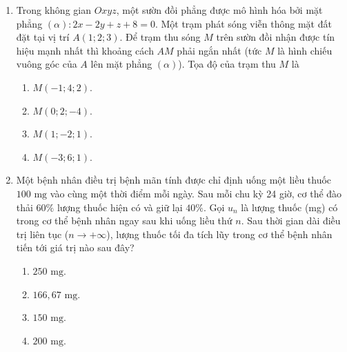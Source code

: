 \documentclass[12pt,a4paper]{article}
\begin{document}
\begin{enumerate}[label=\textbf{Câu \arabic*:}, leftmargin=*]
\item
\begin{minipage}[t]{\linewidth} 
Trong không gian $Oxyz$, một sườn đồi phẳng được mô hình hóa bởi mặt phẳng $(\alpha): 2x - 2y + z + 8 = 0$. Một trạm phát sóng viễn thông mặt đất đặt tại vị trí $A(1; 2; 3)$. Để trạm thu sóng $M$ trên sườn đồi nhận được tín hiệu mạnh nhất thì khoảng cách $AM$ phải ngắn nhất (tức $M$ là hình chiếu vuông góc của $A$ lên mặt phẳng $(\alpha)$). Tọa độ của trạm thu $M$ là
\begin{enumerate}[label=\Alph*., itemsep=0pt, topsep=3pt, parsep=0pt]
    \item $M(-1; 4; 2)$.
    \item $M(0; 2; -4)$.
    \item $M(1; -2; 1)$.
    \item $M(-3; 6; 1)$.
\end{enumerate}
\end{minipage}

\item
\begin{minipage}[t]{\linewidth} 
Một bệnh nhân điều trị bệnh mãn tính được chỉ định uống một liều thuốc $100\text{ mg}$ vào cùng một thời điểm mỗi ngày. Sau mỗi chu kỳ 24 giờ, cơ thể đào thải $60\%$ lượng thuốc hiện có và giữ lại $40\%$. Gọi $u_n$ là lượng thuốc (mg) có trong cơ thể bệnh nhân ngay sau khi uống liều thứ $n$. Sau thời gian dài điều trị liên tục ($n \to +\infty$), lượng thuốc tối đa tích lũy trong cơ thể bệnh nhân tiến tới giá trị nào sau đây?
\begin{enumerate}[label=\Alph*., itemsep=0pt, topsep=3pt, parsep=0pt]
    \item $250\text{ mg}$.
    \item $166{,}67\text{ mg}$.
    \item $150\text{ mg}$.
    \item $200\text{ mg}$.
\end{enumerate}
\end{minipage}


\end{enumerate}
\end{document}
